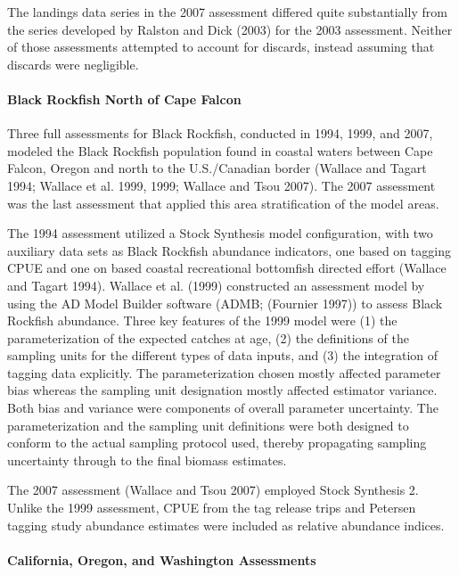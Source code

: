 \documentclass[11pt,
  letterpaper,
]{article}
\begin{document}
The landings data series in the 2007 assessment differed quite substantially from the series developed by Ralston and Dick (2003) for the 2003 assessment. Neither of those assessments attempted to account for discards, instead assuming that discards were negligible.

\hypertarget{black-rockfish-north-of-cape-falcon}{%
\paragraph{Black Rockfish North of Cape Falcon}\label{black-rockfish-north-of-cape-falcon}}

Three full assessments for Black Rockfish, conducted in 1994, 1999, and 2007, modeled the Black Rockfish population found in coastal waters between Cape Falcon, Oregon and north to the U.S./Canadian border (Wallace and Tagart 1994; Wallace et al. 1999, 1999; Wallace and Tsou 2007). The 2007 assessment was the last assessment that applied this area stratification of the model areas.

The 1994 assessment utilized a Stock Synthesis model configuration, with two auxiliary data sets as Black Rockfish abundance indicators, one based on tagging CPUE and one on based coastal recreational bottomfish directed effort (Wallace and Tagart 1994). Wallace et al. (1999) constructed an assessment model by using the AD Model Builder software (ADMB; (Fournier 1997)) to assess Black Rockfish abundance. Three key features of the 1999 model were (1) the parameterization of the expected catches at age, (2) the definitions of the sampling units for the different types of data inputs, and (3) the integration of tagging data explicitly. The parameterization chosen mostly affected parameter bias whereas the sampling unit designation mostly affected estimator variance. Both bias and variance were components of overall parameter uncertainty. The parameterization and the sampling unit definitions were both designed to conform to the actual sampling protocol used, thereby propagating sampling uncertainty through to the final biomass estimates.

The 2007 assessment (Wallace and Tsou 2007) employed Stock Synthesis 2. Unlike the 1999 assessment, CPUE from the tag release trips and Petersen tagging study abundance estimates were included as relative abundance indices.

\hypertarget{california-oregon-and-washington-assessments}{%
\paragraph{California, Oregon, and Washington Assessments}\label{california-oregon-and-washington-assessments}}
\end{document}

